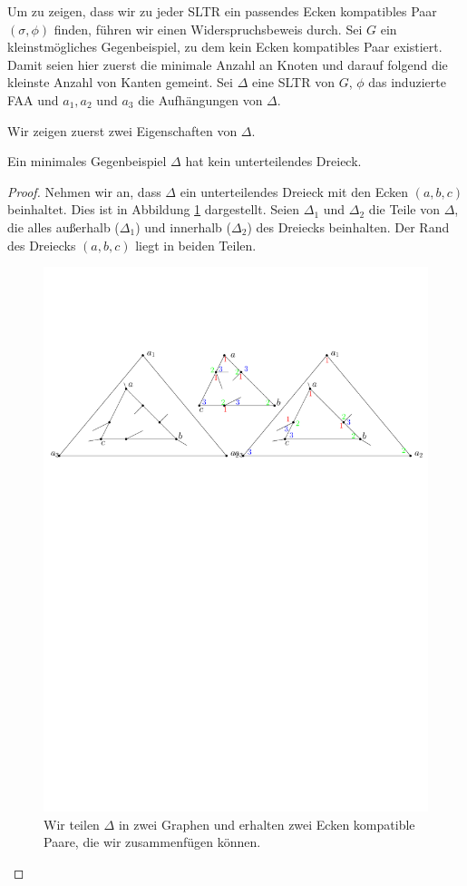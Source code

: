 Um zu zeigen, dass wir zu jeder SLTR ein passendes Ecken kompatibles Paar $(\sigma,\phi)$ finden, führen wir einen Widerspruchsbeweis durch. Sei $G$ ein kleinstmögliches Gegenbeispiel, zu dem kein Ecken kompatibles Paar existiert. Damit seien hier zuerst die minimale Anzahl an Knoten und darauf folgend die kleinste Anzahl von Kanten gemeint. Sei $\Delta$ eine SLTR von $G$, $\phi$ das induzierte FAA und $a_1,a_2$ und $a_3$ die Aufhängungen von $\Delta$.

Wir zeigen zuerst zwei Eigenschaften von $\Delta$.

\begin{lemma}\label{lem2}
Ein minimales Gegenbeispiel $\Delta$ hat kein unterteilendes Dreieck.
\end{lemma}

\begin{proof}
Nehmen wir an, dass $\Delta$ ein unterteilendes Dreieck mit den Ecken $(a,b,c)$ beinhaltet. Dies ist in Abbildung \ref{pic_lem2} dargestellt. Seien $\Delta_1$ und $\Delta_2$ die Teile von $\Delta$, die alles außerhalb ($\Delta_1$) und innerhalb ($\Delta_2$) des Dreiecks beinhalten. Der Rand des Dreiecks $(a,b,c)$ liegt in beiden Teilen.

\begin{figure}
\centering
\includegraphics[width=1\textwidth]{lem2.pdf}
\caption{Wir teilen $\Delta$ in zwei Graphen und erhalten zwei Ecken kompatible Paare, die wir zusammenfügen können.}
\label{pic_lem2}
\centering
\end{figure}


\end{proof}
